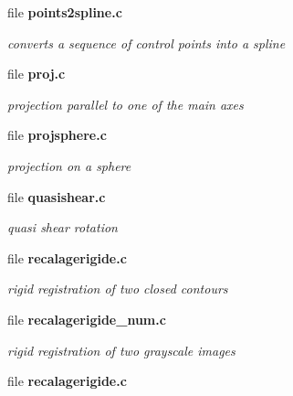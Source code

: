 \begin{DoxyCompactItemize}
\item 
file {\bf points2spline.c}


\begin{DoxyCompactList}\small\item\em converts a sequence of control points into a spline \item\end{DoxyCompactList}

\item 
file {\bf proj.c}


\begin{DoxyCompactList}\small\item\em projection parallel to one of the main axes \item\end{DoxyCompactList}

\item 
file {\bf projsphere.c}


\begin{DoxyCompactList}\small\item\em projection on a sphere \item\end{DoxyCompactList}

\item 
file {\bf quasishear.c}


\begin{DoxyCompactList}\small\item\em quasi shear rotation \item\end{DoxyCompactList}

\item 
file {\bf recalagerigide.c}


\begin{DoxyCompactList}\small\item\em rigid registration of two closed contours \item\end{DoxyCompactList}

\item 
file {\bf recalagerigide\_\-num.c}


\begin{DoxyCompactList}\small\item\em rigid registration of two grayscale images \item\end{DoxyCompactList}

\item 
file {\bf recalagerigide.c}



\end{DoxyCompactItemize}

